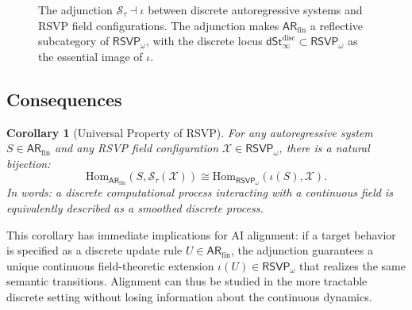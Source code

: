 \documentclass[a4paper,12pt]{article}
\newtheorem{corollary}[theorem]{Corollary}
\theoremstyle{definition}
\newcommand{\ARfin}{\mathsf{AR}_{\mathrm{fin}}}
\newcommand{\RSVPomega}{\mathsf{RSVP}_\omega}
\newcommand{\dSt}{\mathsf{dSt}_\infty}
\newcommand{\Stau}{\mathcal{S}_\tau}
\newcommand{\iotaf}{\iota}
\newcommand{\X}{\mathcal{X}}
\begin{document}
\begin{figure}[h]
\centering
{}
\caption{The adjunction $\Stau \dashv \iotaf$ between discrete autoregressive systems and RSVP field configurations. The adjunction makes $\ARfin$ a reflective subcategory of $\RSVPomega$, with the discrete locus $\dSt^{\mathrm{disc}} \subset \RSVPomega$ as the essential image of $\iotaf$.}
\label{fig:adjunction}
\end{figure}

\subsection{Consequences}

\begin{corollary}[Universal Property of RSVP]
\label{cor:universal}
For any autoregressive system $S \in \ARfin$ and any RSVP field configuration $\X \in \RSVPomega$, there is a natural bijection:
\[
\mathrm{Hom}_{\ARfin}(S, \Stau(\X)) \cong \mathrm{Hom}_{\RSVPomega}(\iotaf(S), \X).
\]
In words: a discrete computational process interacting with a continuous field is equivalently described as a smoothed discrete process.
\end{corollary}

This corollary has immediate implications for AI alignment: if a target behavior is specified as a discrete update rule $U \in \ARfin$, the adjunction guarantees a unique continuous field-theoretic extension $\iotaf(U) \in \RSVPomega$ that realizes the same semantic transitions. Alignment can thus be studied in the more tractable discrete setting without losing information about the continuous dynamics.
\end{document}
